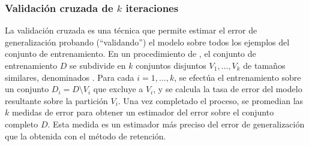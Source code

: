 %
\subsubsection{Validación cruzada de $k$ iteraciones}
\label{s2:crossval}
%
La validación cruzada es una técnica que permite estimar el error de
generalización probando (``validando'') el modelo sobre todos los
ejemplos del conjunto de entrenamiento.
En un procedimiento de 
\cite{crossval}, el conjunto de entrenamiento $D$ se subdivide en $k$
conjuntos disjuntos $V_1,\ldots,V_k$ de tamaños similares, denominados
.
Para cada $i=1,\ldots,k$, se efectúa el entrenamiento sobre un
conjunto $D_i=D\setminus{}V_i$ que excluye a $V_i$, y se calcula la
tasa de error del modelo resultante sobre la partición $V_i$.
Una vez completado el proceso, se promedian las $k$ medidas de error
para obtener un estimador del error sobre el conjunto completo $D$.
Esta medida es un estimador más preciso del error de generalización
que la obtenida con el método de retención.

